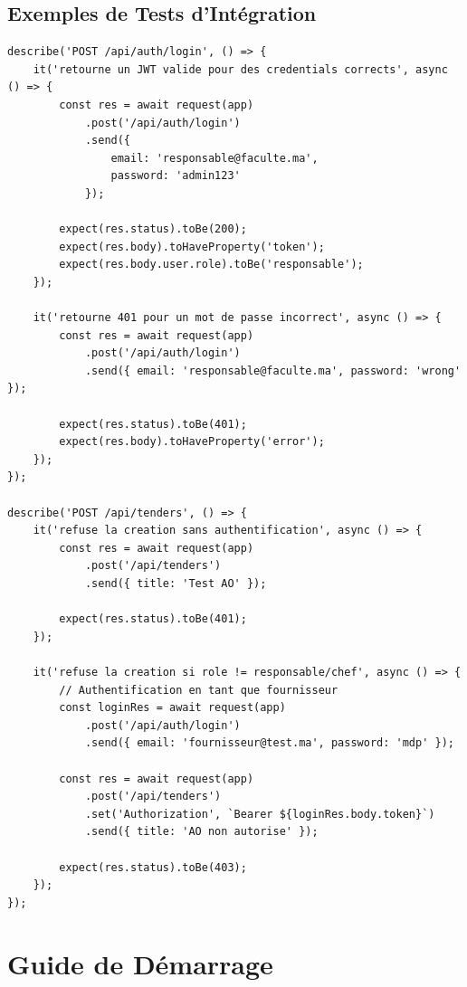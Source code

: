 \documentclass[12pt,a4paper]{report}
\begin{document}
\section{Exemples de Tests d'Intégration}

\begin{lstlisting}[style=js, caption={Tests d'intégration — Authentification}]
describe('POST /api/auth/login', () => {
    it('retourne un JWT valide pour des credentials corrects', async () => {
        const res = await request(app)
            .post('/api/auth/login')
            .send({
                email: 'responsable@faculte.ma',
                password: 'admin123'
            });

        expect(res.status).toBe(200);
        expect(res.body).toHaveProperty('token');
        expect(res.body.user.role).toBe('responsable');
    });

    it('retourne 401 pour un mot de passe incorrect', async () => {
        const res = await request(app)
            .post('/api/auth/login')
            .send({ email: 'responsable@faculte.ma', password: 'wrong' });

        expect(res.status).toBe(401);
        expect(res.body).toHaveProperty('error');
    });
});

describe('POST /api/tenders', () => {
    it('refuse la creation sans authentification', async () => {
        const res = await request(app)
            .post('/api/tenders')
            .send({ title: 'Test AO' });

        expect(res.status).toBe(401);
    });

    it('refuse la creation si role != responsable/chef', async () => {
        // Authentification en tant que fournisseur
        const loginRes = await request(app)
            .post('/api/auth/login')
            .send({ email: 'fournisseur@test.ma', password: 'mdp' });

        const res = await request(app)
            .post('/api/tenders')
            .set('Authorization', `Bearer ${loginRes.body.token}`)
            .send({ title: 'AO non autorise' });

        expect(res.status).toBe(403);
    });
});
\end{lstlisting}

\chapter{Guide de Démarrage}
\end{document}
